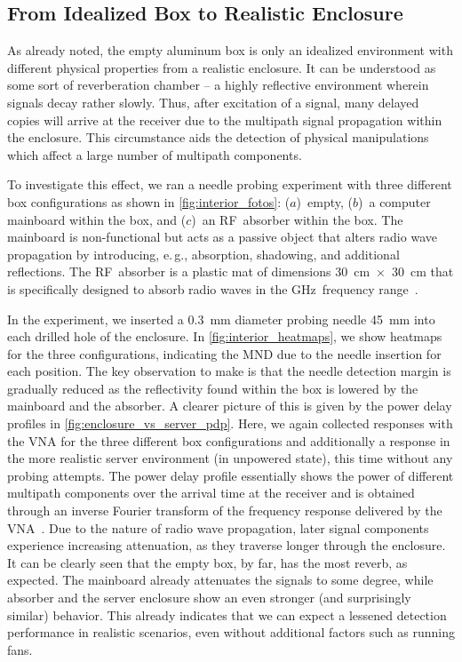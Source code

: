 \documentclass[conference]{IEEEtran}
\makeatletter
\newcommand{\eg}{e.\@\,g.\@\xspace}
\makeatother
\begin{document}
\subsection{From Idealized Box to Realistic Enclosure}
\label{sec:ideal_box_to_realistic}
As already noted, the empty aluminum box is only an idealized environment with different physical properties from a realistic enclosure. It can be understood as some sort of reverberation chamber -- a highly reflective environment wherein signals decay rather slowly. Thus, after excitation of a signal, many delayed copies will arrive at the receiver due to the multipath signal propagation within the enclosure. This circumstance aids the detection of physical manipulations which affect a large number of multipath components.

To investigate this effect, we ran a needle probing experiment with three different box configurations as shown in \autoref{fig:interior_fotos}: ($a$)~empty, ($b$)~a computer mainboard within the box, and ($c$)~an RF~absorber within the box. The mainboard is non-functional but acts as a passive object that alters radio wave propagation by introducing, \eg, absorption, shadowing, and additional reflections. The RF~absorber is a plastic mat of dimensions \SI{30}{\cm}~$\times$~\SI{30}{\cm} that is specifically designed to absorb radio waves in the GHz~frequency range~\cite{absorber_reference}.

In the experiment, we inserted a \SI{0.3}{\mm} diameter probing needle \SI{45}{\mm} into each drilled hole of the enclosure. In \autoref{fig:interior_heatmaps}, we show heatmaps for the three configurations, indicating the MND due to the needle insertion for each position. The key observation to make is that the needle detection margin is gradually reduced as the reflectivity found within the box is lowered by the mainboard and the absorber. A clearer picture of this is given by the power delay profiles in \autoref{fig:enclosure_vs_server_pdp}. Here, we again collected responses with the VNA for the three different box configurations and additionally a response in the more realistic server environment (in unpowered state), this time without any probing attempts. The power delay profile essentially shows the power of different multipath components over the arrival time at the receiver and is obtained through an inverse Fourier transform of the frequency response delivered by the VNA~\cite{goldsmith_wireless_2005}. Due to the nature of radio wave propagation, later signal components experience increasing attenuation, as they traverse longer through the enclosure. It can be clearly seen that the empty box, by far, has the most reverb, as expected. The mainboard already attenuates the signals to some degree, while absorber and the server enclosure show an even stronger (and surprisingly similar) behavior. This already indicates that we can expect a lessened detection performance in realistic scenarios, even without additional factors such as running fans.
\end{document}

